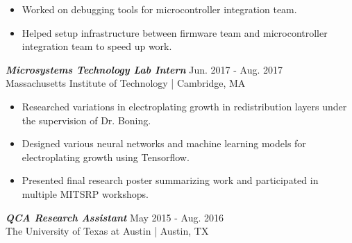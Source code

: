 \documentclass[letter]{res}
\begin{document}
\begin{resume}
 \vspace{-4mm}

 \begin{itemize}
 \item Worked on debugging tools for microcontroller integration team. 
 \item Helped setup infrastructure between firmware team and microcontroller integration team to speed up work. 
 \end{itemize}
 
\vspace{-2mm}

{\sl \textbf{Microsystems Technology Lab Intern}} \hfill Jun. 2017 - Aug. 2017\\
Massachusetts Institute of Technology | Cambridge, MA \newline

 \vspace{-4mm}

 \begin{itemize}
 \item Researched variations in electroplating growth in redistribution layers under the supervision of Dr. Boning.
 \item Designed various neural networks and machine learning models for electroplating growth using Tensorflow.
 \item Presented final research poster summarizing work and participated in multiple MITSRP workshops.
 \end{itemize}
 
\vspace{-2mm}

%
%
% 

{\sl \textbf{QCA Research Assistant}} \hfill May 2015 - Aug. 2016\\
The University of Texas at Austin | Austin, TX \newline


\end{resume}
\end{document}

